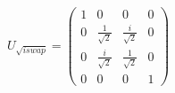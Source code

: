 \documentclass[preview, border={5pt,5pt,5pt,5pt}]{standalone}
\begin{document}
$
U_{\sqrt{iswap}} =
\begin{pmatrix}
    1 & 0 & 0 & 0 \\
    0 & \frac{1}{\sqrt{2}} & \frac{i}{\sqrt{2}} & 0 \\
    0 & \frac{i}{\sqrt{2}} & \frac{1}{\sqrt{2}} & 0 \\
    0 & 0 & 0 & 1
\end{pmatrix}
$
\end{document}
